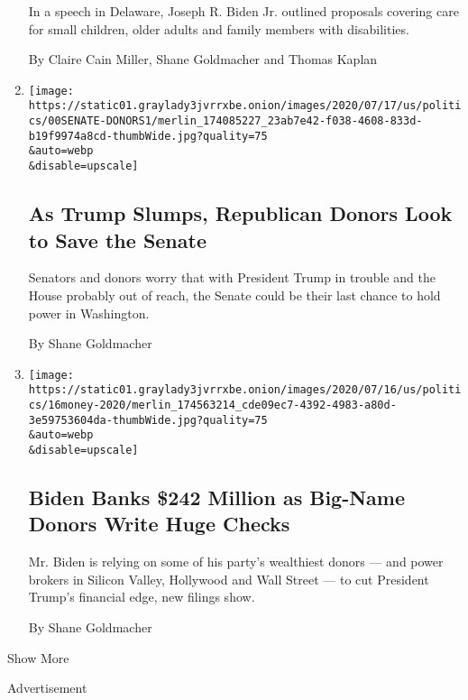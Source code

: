 \begin{enumerate}
  In a speech in Delaware, Joseph R. Biden Jr. outlined proposals
  covering care for small children, older adults and family members with
  disabilities.

  By Claire Cain Miller, Shane Goldmacher and Thomas Kaplan
\item
  \href{/2020/07/20/us/politics/trump-polls-senate.html}{}

  \texttt{[image: https://static01.graylady3jvrrxbe.onion/images/2020/07/17/us/politics/00SENATE-DONORS1/merlin\_174085227\_23ab7e42-f038-4608-833d-b19f9974a8cd-thumbWide.jpg?quality=75\\\&auto=webp\\\&disable=upscale]}

  \hypertarget{as-trump-slumps-republican-donors-look-to-save-the-senate}{%
  \subsection{As Trump Slumps, Republican Donors Look to Save the
  Senate}\label{as-trump-slumps-republican-donors-look-to-save-the-senate}}

  Senators and donors worry that with President Trump in trouble and the
  House probably out of reach, the Senate could be their last chance to
  hold power in Washington.

  By Shane Goldmacher
\item
  \href{/2020/07/16/us/politics/joe-biden-fund-raising.html}{}

  \texttt{[image: https://static01.graylady3jvrrxbe.onion/images/2020/07/16/us/politics/16money-2020/merlin\_174563214\_cde09ec7-4392-4983-a80d-3e59753604da-thumbWide.jpg?quality=75\\\&auto=webp\\\&disable=upscale]}

  \hypertarget{biden-banks-242-million-as-big-name-donors-write-huge-checks}{%
  \subsection{Biden Banks \$242 Million as Big-Name Donors Write Huge
  Checks}\label{biden-banks-242-million-as-big-name-donors-write-huge-checks}}

  Mr. Biden is relying on some of his party's wealthiest donors --- and
  power brokers in Silicon Valley, Hollywood and Wall Street --- to cut
  President Trump's financial edge, new filings show.

  By Shane Goldmacher
\end{enumerate}

Show More

Advertisement

